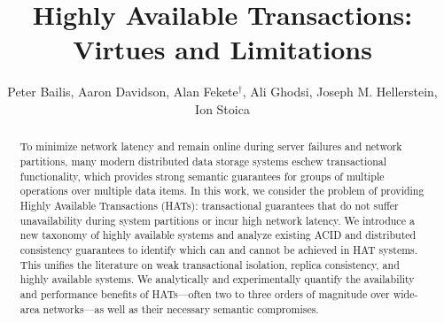 \documentclass{vldb}
\newif\iftechreport
\theoremstyle{definition}
\let\footnotesize\small
\begin{document}

\title{Highly Available Transactions: Virtues and Limitations\iftechreport\\(Extended Version)\fi}
{\author{Peter Bailis, Aaron Davidson, Alan Fekete{\fontsize{12}{14}$^\dagger$}, Ali Ghodsi, Joseph M. Hellerstein, Ion Stoica \\{}}}
\maketitle

\begin{abstract}
\noindent To minimize network latency and remain online during server
failures and network partitions, many modern distributed data storage
systems eschew transactional functionality, which provides strong
semantic guarantees for groups of multiple operations over multiple
data items. In this work, we consider the problem of providing Highly
Available Transactions (HATs): transactional guarantees that do not
suffer unavailability during system partitions or incur high network
latency.  We introduce a new taxonomy of highly available systems and
analyze existing ACID and distributed consistency guarantees to
identify which can and cannot be achieved in HAT systems. This unifies
the literature on weak transactional isolation, replica consistency,
and highly available systems. We analytically and experimentally
quantify the availability and performance benefits of HATs---often two
to three orders of magnitude over wide-area networks---as well as
their necessary semantic compromises.
\end{abstract}













%





\scriptsize

  




\iftechreport
\pagebreak
\begin{appendix}


\end{appendix}
\fi
\end{document}
